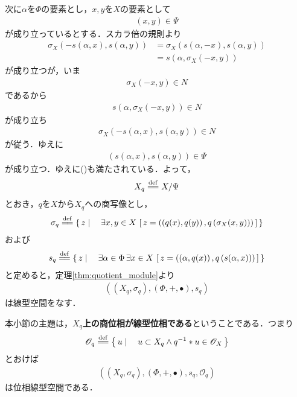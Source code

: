 	次に$\alpha$を$\Phi$の要素とし，$x,y$を$X$の要素として
	\begin{align}
		(x,y) \in \Psi
	\end{align}
	が成り立っているとする．スカラ倍の規則より
	\begin{align}
		\sigma_X\left(-s(\alpha,x),s(\alpha,y)\right)
		&= \sigma_X\left(s(\alpha,-x),s(\alpha,y)\right) \\
		&= s\left(\alpha,\sigma_X(-x,y)\right)
	\end{align}
	が成り立つが，いま
	\begin{align}
		\sigma_X(-x,y) \in N
	\end{align}
	であるから
	\begin{align}
		s\left(\alpha,\sigma_X(-x,y)\right) \in N
	\end{align}
	が成り立ち
	\begin{align}
		\sigma_X\left(-s(\alpha,x),s(\alpha,y)\right) \in N
	\end{align}
	が従う．ゆえに
	\begin{align}
		\left(s(\alpha,x),s(\alpha,y)\right) \in \Psi
	\end{align}
	が成り立つ．ゆえに()も満たされている．よって，
	\begin{align}
		X_q \defeq X/\Psi
	\end{align}
	とおき，$q$を$X$から$X_q$への商写像とし，
	\begin{align}
		\sigma_q \defeq \Set{z}{\exists x,y \in X\, 
		\left[\, z=\left(\left(q(x),q(y)\right),q\left(\sigma_X(x,y)\right)\right)\, \right]}
	\end{align}
	および
	\begin{align}
		s_q \defeq \Set{z}{\exists \alpha \in \Phi\, \exists x \in X\, 
		\left[\, z=\left(\left(\alpha,q(x)\right),q\left(s(\alpha,x)\right)\right)\, \right]}
	\end{align}
	と定めると，定理\ref{thm:quotient_module}より
	\begin{align}
		\left(\left(X_q,\sigma_q\right),\left(\Phi,+,\bullet\right),s_q\right)
	\end{align}
	は線型空間をなす．
	
	本小節の主題は，{\bf $X_q$上の商位相が線型位相である}ということである．つまり
	\begin{align}
		\mathscr{O}_q \defeq \Set{u}{u \subset X_q \wedge q^{-1} \ast u \in \mathscr{O}_X}
	\end{align}
	とおけば
	\begin{align}
		\left(\left(X_q,\sigma_q\right),\left(\Phi,+,\bullet\right),s_q,\mathscr{O}_q\right)
	\end{align}
	は位相線型空間である．
	
